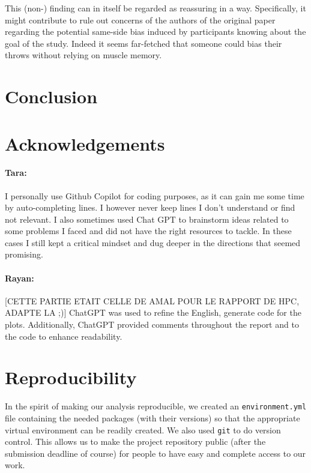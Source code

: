 \documentclass[a4paper, 12pt,oneside]{article}
\begin{document}
		This (non-) finding can in itself be regarded as reassuring in a way. Specifically, it might contribute to rule out concerns of the authors of the original paper regarding the potential same-side bias induced by participants knowing about the goal of the study. Indeed it seems far-fetched that someone could bias their throws without relying on muscle memory. 
	\section{Conclusion}
	\section*{Acknowledgements}
		\paragraph{Tara:}
		I personally use Github Copilot for coding purposes, as it can gain me some time by auto-completing lines. I however never keep lines I don't understand or find not relevant. I also sometimes used Chat GPT to brainstorm ideas related to some problems I faced and did not have the right resources to tackle. In these cases I still kept a critical mindset and dug deeper in the directions that seemed promising.
		\paragraph{Rayan:}
		[CETTE PARTIE ETAIT CELLE DE AMAL POUR LE RAPPORT DE HPC, ADAPTE LA ;)]
		ChatGPT was used to refine the English, generate code for the plots. Additionally, ChatGPT provided comments throughout the report and to the code to enhance readability.
	\section*{Reproducibility}
		In the spirit of making our analysis reproducible, we created an \texttt{environment.yml} file containing the needed packages (with their versions) so that the appropriate virtual environment can be readily created. We also used \texttt{git} to do version control. This allows us to make the project repository public (after the submission deadline of course) for people to have easy and complete access to our work. 
\end{document}

